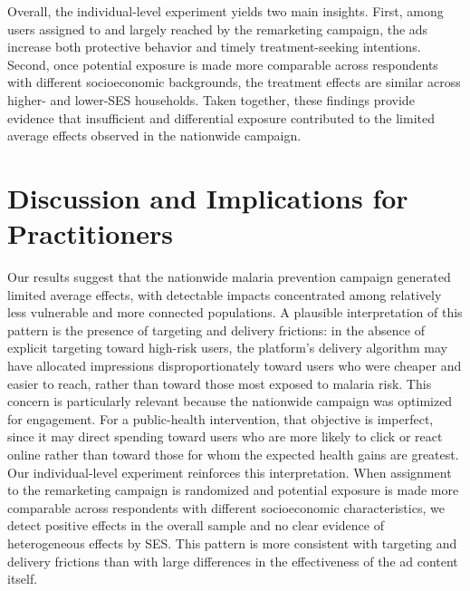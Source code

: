 Overall, the individual-level experiment yields two main insights. First, among users assigned to and largely reached by the remarketing campaign, the ads increase both protective behavior and timely treatment-seeking intentions. Second, once potential exposure is made more comparable across respondents with different socioeconomic backgrounds, the treatment effects are similar across higher- and lower-SES households. Taken together, these findings provide evidence that insufficient and differential exposure contributed to the limited average effects observed in the nationwide campaign.


\section{Discussion and Implications for Practitioners}
Our results suggest that the nationwide malaria prevention campaign generated limited average effects, with detectable impacts concentrated among relatively less vulnerable and more connected populations. A plausible interpretation of this pattern is the presence of targeting and delivery frictions: in the absence of explicit targeting toward high-risk users, the platform’s delivery algorithm may have allocated impressions disproportionately toward users who were cheaper and easier to reach, rather than toward those most exposed to malaria risk. This concern is particularly relevant because the nationwide campaign was optimized for engagement. For a public-health intervention, that objective is imperfect, since it may direct spending toward users who are more likely to click or react online rather than toward those for whom the expected health gains are greatest. Our individual-level experiment reinforces this interpretation. When assignment to the remarketing campaign is randomized and potential exposure is made more comparable across respondents with different socioeconomic characteristics, we detect positive effects in the overall sample and no clear evidence of heterogeneous effects by SES. This pattern is more consistent with targeting and delivery frictions than with large differences in the effectiveness of the ad content itself.

